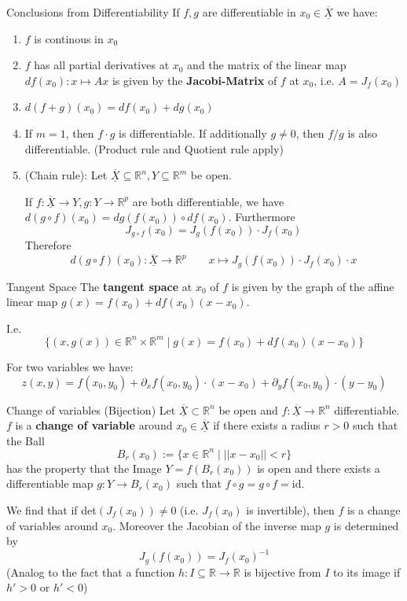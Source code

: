 \documentclass[a4paper,fontsize = 10pt]{article}
\def\R{\mathbb{R}}
\def\X{\underline{\overline{X}}}
\begin{document}
\begin{mainbox}{Conclusions from Differentiability}
    If \(f,g\) are differentiable in \(x_0 \in \X\) we have:
    \begin{enumerate}
    \item \(f\) is continous in \(x_0\)
    \item \(f\) has all partial derivatives at \(x_0\) and the matrix of the linear map \(df(x_0): x \mapsto Ax\) is given by the \textbf{Jacobi-Matrix} of \(f\) at \(x_0\), i.e. \(A = J_f(x_0)\)
    \item \(d(f+g)(x_0) = df(x_0) + dg(x_0)\)
    \item If \(m = 1\), then \(f\cdot g\) is differentiable. If additionally \(g \ne 0\), then \(f/g\) is also differentiable. (Product rule and Quotient rule apply)
    \item (Chain rule): Let $\X \subseteq \R^n, Y \subseteq \R^m$ be open. 
    
    If \(f: \X \to Y, g: Y \to \R^p\) are both differentiable, we have \(d(g \circ f)(x_0) = dg(f(x_0)) \circ df(x_0)\). 
    Furthermore \[J_{g \circ f}(x_0) = J_g(f(x_0)) \cdot J_f(x_0)\]
    Therefore \[d(g \circ f)(x_0): \X \to \R^p \qquad x \mapsto J_g(f(x_0)) \cdot J_f(x_0) \cdot x\]
    \end{enumerate}
\end{mainbox}

\begin{subbox}{Tangent Space}
  The \textbf{tangent space} at $x_0$ of \(f\) is given by the graph of the affine linear map \(g(x) = f(x_0) + df(x_0)(x-x_0)\).
  
  I.e. \[\{(x,g(x)) \in \R^n\times\R^m \mid g(x) = f(x_0) + df(x_0)(x-x_0)\}\]

  For two variables we have:
  \[ z(x,y) = f(x_0,y_0) + \partial_x f(x_0,y_0) \cdot (x-x_0)+ \partial_y f(x_0,y_0) \cdot (y-y_0)\]

\end{subbox}

\begin{mainbox}{Change of variables (Bijection)}
    Let $\X \subset \R^n$ be open and $f: \X \to \R^n$ differentiable. $f$ is a \textbf{change of variable} around $x_0 \in \X$ if there exists a radius $r > 0$ such that the Ball 
    \[B_r(x_0) := \{x \in \R^n \mid ||x-x_0|| < r\}\] 
    has the property that the Image $Y = f(B_r(x_0))$ is open and there exists a differentiable map $g: Y \to B_r(x_0)$ such that $f \circ g = g \circ f =\text{id}$.

    We find that if det\((J_f(x_0)) \neq 0\) (i.e. $J_f(x_0)$ is invertible), then $f$ is a change of variables around $x_0$. Moreover the Jacobian of the inverse map $g$ is determined by \[J_g(f(x_0)) = J_f(x_0)^{-1}\]
    (Analog to the fact that a function $h: I \subseteq \R \to \R$ is bijective from $I$ to its image if $h' > 0$ or $h' < 0$)
\end{mainbox}
\end{document}
